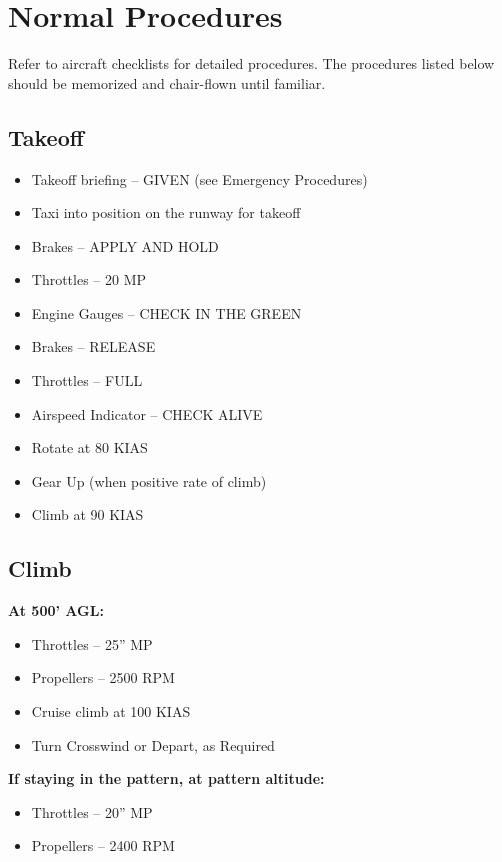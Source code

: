 
\chapter{Normal Procedures}

Refer to aircraft checklists for detailed procedures. The procedures listed below
should be memorized and chair-flown until familiar.


\section{Takeoff}

\begin{itemize}[label={}]
\item Takeoff briefing – GIVEN (see Emergency Procedures)
\item Taxi into position on the runway for takeoff
\item Brakes – APPLY AND HOLD
\item Throttles – 20 MP
\item Engine Gauges – CHECK IN THE GREEN
\item Brakes – RELEASE
\item Throttles – FULL
\item Airspeed Indicator – CHECK ALIVE
\item Rotate at 80 KIAS
\item Gear Up (when positive rate of climb)
\item Climb at 90 KIAS
\end{itemize}

\section{Climb}
\textbf{At 500' AGL:}
\begin{itemize}[label={}]
\item Throttles – 25” MP
\item Propellers – 2500 RPM
\item Cruise climb at 100 KIAS
\item Turn Crosswind or Depart, as Required
\end{itemize}
\textbf{If staying in the pattern, at pattern altitude:}
\begin{itemize}[label={}]
\item Throttles – 20” MP
\item Propellers – 2400 RPM
\end{itemize}


